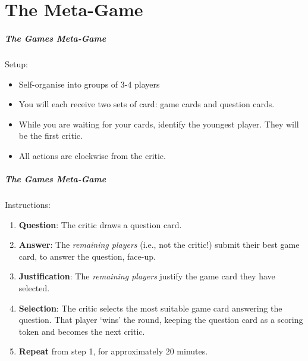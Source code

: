 



\part{The Meta-Game}
\frame{\partpage}

\begin{frame}
	\frametitle{The Games Meta-Game}
	
	Setup:
	
	\begin{itemize}
		\item Self-organise into groups of 3-4 players
		\item You will each receive two sets of card: game cards and question cards.
		\item While you are waiting for your cards, identify the youngest player. They will be the first critic.
		\item All actions are clockwise from the critic.
	\end{itemize}
\end{frame}

\begin{frame}
	\frametitle{The Games Meta-Game}
	
	Instructions:
	
	\begin{enumerate}
		\item 	\textbf{Question}: The critic draws a question card. 
		\item 	\textbf{Answer}: The \textit{remaining players} (i.e., not the critic!) submit their best game card, to answer the question, face-up.
		\item 	\textbf{Justification}: The \textit{remaining players} justify the game card they have selected.
		\item 	\textbf{Selection}: The critic selects the most suitable game card answering the question. That player `wins' the round, keeping the question card as a scoring token
			and becomes the next critic.	
		\item 	\textbf{Repeat} from step 1, for approximately 20 minutes.	
	\end{enumerate}
\end{frame}
   
